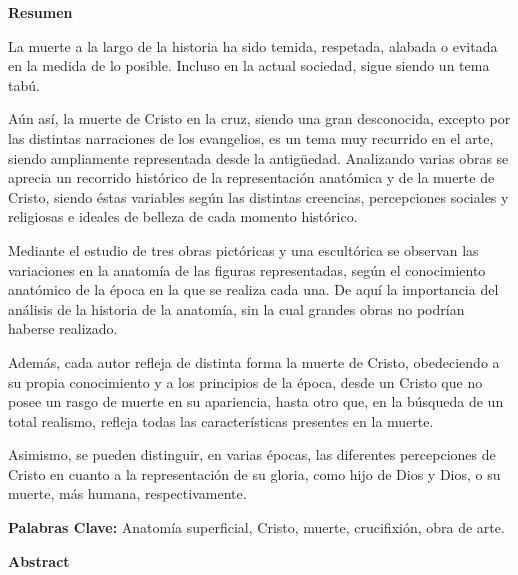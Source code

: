 \textbf{Resumen}

La muerte a la largo de la historia ha sido temida, respetada, alabada o evitada en la medida de lo posible. Incluso en la actual sociedad, %
sigue siendo un tema tabú.

Aún así, la muerte de Cristo en la cruz, siendo una gran desconocida, excepto por las distintas narraciones de los evangelios, es un tema muy recurrido en el arte, siendo ampliamente representada desde la antigüedad. Analizando varias obras se aprecia un recorrido histórico de la representación anatómica y de la muerte de Cristo, siendo éstas variables según las distintas creencias, percepciones sociales y religiosas e ideales de belleza de cada momento histórico.

Mediante el estudio de tres obras pictóricas y una escultórica se observan las variaciones en la anatomía %
 de las figuras representadas, según el conocimiento anatómico de la época en la que se realiza cada una. %
De aquí la importancia del análisis de la historia de la anatomía, sin la cual grandes obras %
no podrían haberse realizado.

Además, cada autor refleja de distinta forma la muerte de Cristo, obedeciendo a su propia conocimiento y a los principios de la época, desde un Cristo que no posee un rasgo de muerte en su apariencia, hasta otro que, en la búsqueda de un total realismo, refleja %
todas las características presentes en la muerte. %


Asimismo, se pueden distinguir, en varias épocas, las diferentes percepciones de Cristo en cuanto a la representación de su gloria, como hijo de Dios y Dios, o su muerte, más humana, respectivamente.


\textbf{Palabras Clave:}
Anatomía superficial, Cristo, muerte, crucifixión, obra de arte.

\vspace{10pt}

\textbf{Abstract}

